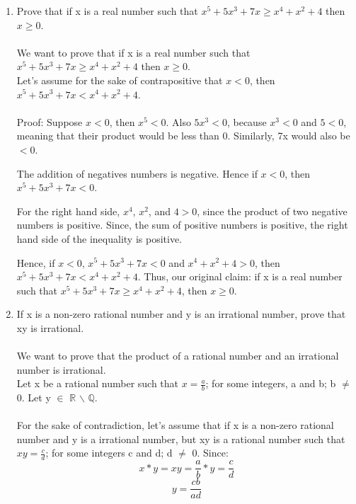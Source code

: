 \documentclass[12pt]{article}
\begin{document}
\begin{enumerate}
    \item Prove that if x is a real number such that $x^5 + 5x^3 + 7x \geq x^4 + x^2 + 4$ then $x \geq 0$. \\
    \\
    We want to prove that if x is a real number such that $x^5 + 5x^3 + 7x \geq x^4 + x^2 + 4$ then $x \geq 0$. \\
    Let's assume for the sake of contrapositive that $x < 0$, then $x^5 + 5x^3 + 7x < x^4 + x^2 + 4$. \\
    \\
    Proof: Suppose $x < 0$, then $x^5 < 0$. Also $5x^3 < 0$, because $x^3 < 0$ and $5 < 0$, meaning that their product would be less than 0. Similarly, 7x would also be $< 0$. 

    The addition of negatives numbers is negative. Hence if $x < 0$, then $x^5 + 5x^3 + 7x < 0$. 

    For the right hand side, $x^4$, $x^2$, and $4 > 0$, since the product of two negative numbers is positive. Since, the sum of positive numbers is positive, the right hand side of the inequality is positive. 

    Hence, if $x < 0$, $x^5 + 5x^3 + 7x < 0$ and $x^4 + x^2 + 4 > 0$, then $x^5 + 5x^3 + 7x < x^4 + x^2 + 4$. 
    Thus, our original claim: if x is a real number such that $x^5 + 5x^3 + 7x \geq x^4 + x^2 + 4$, then $x \geq 0$. \qedsymbol{}
    
    \item If x is a non-zero rational number and y is an irrational number, prove that xy is irrational. 
    \\
    \\
    We want to prove that the product of a rational number and an irrational number is irrational. \\
    Let x be a rational number such that $x = \frac{a}{b}$; for some integers, a and b; b $\neq$ 0. Let y $\in$ $\mathbb{R}$ $\backslash$ $\mathbb{Q}$. \\
    \\
    For the sake of contradiction, let's assume that if x is a non-zero rational number and y is a irrational number, but xy is a rational number such that $xy = \frac{c}{d}$; for some integers c and d; d $\neq$ 0.
    Since:
    \begin{equation}
        x * y = xy = \frac{a}{b} * y = \frac{c}{d}
    \end{equation}
    \begin{equation}
         y = \frac{cb}{ad}
    \end{equation}


\end{enumerate}
\end{document}
